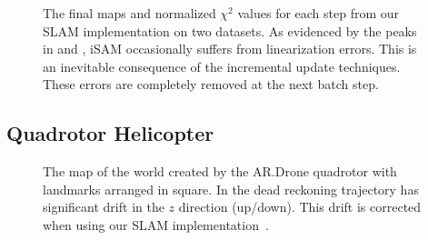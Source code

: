 \documentclass[conference]{IEEEtran}
\begin{document}
\begin{figure}[!t]
\begin{center}
{      \label{fig:victoriaChi2}}
  \end{center}
  \caption{The final maps and normalized $\chi^2$ values for each step from our SLAM
    implementation on two datasets.  As evidenced by the peaks in
     and , iSAM occasionally suffers
    from linearization errors. This is an inevitable consequence of the incremental update
    techniques. These errors are completely removed at the next batch step.}
  \label{fig:manhattan}
\end{figure}


\subsection{Quadrotor Helicopter}
\label{sub:results}

\begin{figure}[!t]
  \begin{center}
    \caption{The map of the world created by the AR.Drone quadrotor with landmarks
      arranged in square.  In  the dead reckoning trajectory has
      significant drift in the $z$ direction (up/down).  This drift is corrected when
      using our \ac{SLAM} implementation~.}
    \label{fig:mapadjustment}
  \end{center}
\end{figure}
\end{document}
